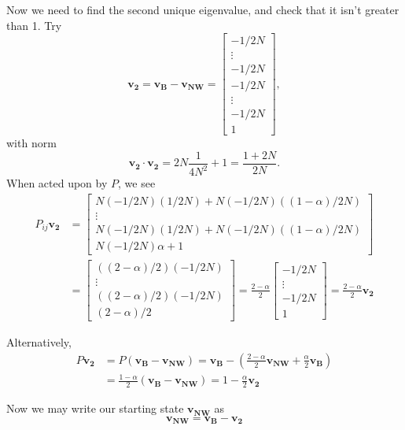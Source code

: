 \documentclass[11pt]{article}
\begin{document}
Now we need to find the second unique eigenvalue, and check that it isn't greater than 1. Try
\begin{equation}
\mathbf{v_2} = \mathbf{v_B} - \mathbf{v_{NW}} = \left[\begin{array}{c}
-1/2N \\ \vdots \\ -1/2N \\ -1/2N \\ \vdots \\ -1/2N \\ 1
\end{array}\right],
\end{equation}
with norm
\begin{equation}
\mathbf{v_2}\cdot\mathbf{v_2} = 2N\frac{1}{4N^2} + 1 = \frac{1 + 2N}{2N}.
\end{equation}
When acted upon by $P$, we see
\begin{align}
P_{ij}\mathbf{v_2} &= \left[\begin{array}{c}
N(-1/2N)(1/2N) + N(-1/2N)((1-\alpha)/2N)\\
\vdots\\
N(-1/2N)(1/2N) + N(-1/2N)((1-\alpha)/2N) \\
N(-1/2N)\alpha + 1
\end{array}\right] \\
&=\left[\begin{array}{c}
((2-\alpha)/2)(-1/2N)\\
\vdots\\
((2-\alpha)/2)(-1/2N) \\
(2-\alpha)/2
\end{array}\right]= \frac{2-\alpha}{2}\left[\begin{array}{c}
-1/2N\\\vdots\\-1/2N\\1
\end{array}\right]=\frac{2-\alpha}{2}\mathbf{v_2}
\end{align}

Alternatively,
\begin{align}
P\mathbf{v_2} &= P(\mathbf{v_B} - \mathbf{v_{NW}}) = \mathbf{v_B} - (\frac{2-\alpha}{2}\mathbf{v_{NW}} + \frac{\alpha}{2}\mathbf{v_B})\\
&=\frac{1-\alpha}{2}(\mathbf{v_B} - \mathbf{v_{NW}}) = 1-\frac{\alpha}{2}\mathbf{v_2}
\end{align}


Now we may write our starting state $\mathbf{v_{NW}}$ as 
\begin{equation}
\mathbf{v_{NW}} = \mathbf{v_B} - \mathbf{v_2}
\end{equation}
\end{document}
